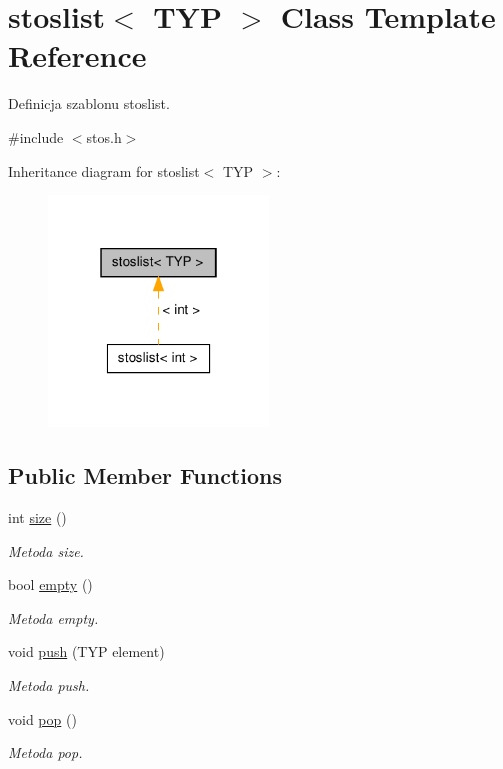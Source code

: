 \hypertarget{classstoslist}{\section{stoslist$<$ T\-Y\-P $>$ Class Template Reference}
\label{classstoslist}
}


Definicja szablonu stoslist.  




{\ttfamily \#include $<$stos.\-h$>$}



Inheritance diagram for stoslist$<$ T\-Y\-P $>$\-:\nopagebreak
\begin{figure}[H]
\begin{center}
\leavevmode
\includegraphics[width=166pt]{classstoslist__inherit__graph}
\end{center}
\end{figure}
\subsection*{Public Member Functions}
\begin{DoxyCompactItemize}
\item 
int \hyperlink{classstoslist_a5bf76e0da8be5a74aca69cde32768572}{size} ()
\begin{DoxyCompactList}\small\item\em Metoda size. \end{DoxyCompactList}\item 
bool \hyperlink{classstoslist_adfcff6fccf977218b512def56b285f4f}{empty} ()
\begin{DoxyCompactList}\small\item\em Metoda empty. \end{DoxyCompactList}\item 
void \hyperlink{classstoslist_af307aa8a238c1ae5b223bbb903210086}{push} (T\-Y\-P element)
\begin{DoxyCompactList}\small\item\em Metoda push. \end{DoxyCompactList}\item 
void \hyperlink{classstoslist_aca316220c9241b4fcff1e3bfce72eee1}{pop} ()
\begin{DoxyCompactList}\small\item\em Metoda pop. \end{DoxyCompactList}\end{DoxyCompactItemize}
